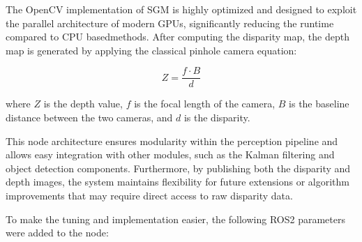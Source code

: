 The OpenCV implementation of SGM is highly optimized and designed to exploit the parallel 
architecture of modern GPUs, significantly reducing the runtime compared to \gls{CPU} basedmethods. 
After computing the disparity map, the depth map is generated by applying the classical 
pinhole camera equation:

\begin{equation}
Z = \frac{f \cdot B}{d}
\end{equation}

where $Z$ is the depth value, $f$ is the focal length of the camera, $B$ is the baseline distance 
between the two cameras, and $d$ is the disparity.

This node architecture ensures modularity within the perception pipeline and allows easy 
integration with other modules, such as the Kalman filtering and object detection components. 
Furthermore, by publishing both the disparity and depth images, the system maintains flexibility 
for future extensions or algorithm improvements that may require direct access to raw disparity data.

To make the tuning and implementation easier, the following ROS2 parameters were added to the node:

